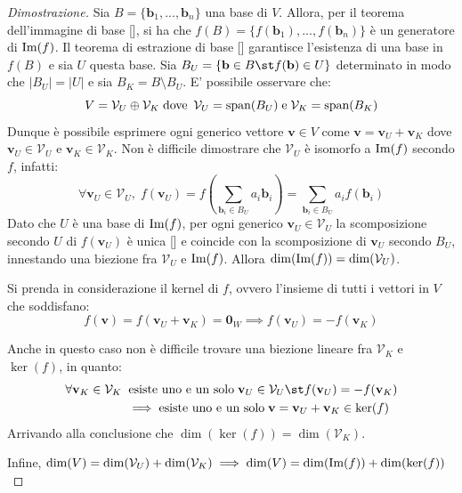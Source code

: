     \begin{proof}[Dimostrazione]
        Sia $B = \{ \mathbf{b}_{1}, ..., \mathbf{b}_{n} \}$ una base di $V$. Allora, per il teorema dell'immagine di base [], si ha che $f(B) = \{f(\mathbf{b}_{1}), ..., f(\mathbf{b}_{n})\}$ è un generatore di $\textnormal{Im}(f)$.
        Il teorema di estrazione di base [] garantisce l'esistenza di una base in $f(B)$ e sia $U$ questa base. Sia $B_U = \{\mathbf{b} \in B \st f(\mathbf{b}) \in U\}$ determinato in modo che $|B_U| = |U|$ e sia $B_K = B \setminus B_U$. E' possibile osservare che:
        \[
            V = \mathcal{V}_U \oplus \mathcal{V}_K \; \textnormal{dove} \;\: \mathcal{V}_U = \textnormal{span}(B_U) \; \textnormal{e} \; \mathcal{V}_K = \textnormal{span}(B_K)
        \]
        Dunque è possibile esprimere ogni generico vettore $\mathbf{v} \in V$ come $\mathbf{v} = \mathbf{v}_U + \mathbf{v}_K$ dove $\mathbf{v}_U \in \mathcal{V}_U$ e $\mathbf{v}_K \in \mathcal{V}_K$.
        Non è difficile dimostrare che $\mathcal{V}_U$ è isomorfo a $\textnormal{Im}(f)$ secondo $f$, infatti:
        \[
            \forall \mathbf{v}_U \in \mathcal{V}_U, \; f(\mathbf{v}_U) = f(\sum_{\mathbf{b}_{i} \in B_U} a_i \mathbf{b}_{i}) = \sum_{\mathbf{b}_{i} \in B_U} a_i f(\mathbf{b}_{i})
        \]
        Dato che $U$ è una base di $\textnormal{Im}(f)$, per ogni generico $\mathbf{v}_U \in \mathcal{V}_U$ la scomposizione secondo $U$ di $f(\mathbf{v}_U)$ è unica [] e coincide con la scomposizione di $\mathbf{v}_U$ secondo $B_U$, innestando una biezione fra $\mathcal{V}_U$ e $\textnormal{Im}(f)$.
        Allora $\dim(\textnormal{Im}(f)) = \dim(\mathcal{V}_U)$.

        \vspace{10pt}
        Si prenda in considerazione il kernel di $f$, ovvero l'insieme di tutti i vettori in $V$ che soddisfano:
        \[
            f(\mathbf{v}) = f(\mathbf{v}_U + \mathbf{v}_K) = \mathbf{0}_W \implies f(\mathbf{v}_U) = -f(\mathbf{v}_K)
        \]

        Anche in questo caso non è difficile trovare una biezione lineare fra $\mathcal{V}_K$ e $\ker(f)$, in quanto:
        \[
            \begin{aligned}
                \forall \mathbf{v}_K \in \mathcal{V}_K \;&\;
                \textnormal{esiste uno e un solo} \;
                \mathbf{v}_U \in \mathcal{V}_U \st
                f(\mathbf{v}_U) = -f(\mathbf{v}_K) \\
                &\implies \textnormal{esiste uno e un solo} \;
                \mathbf{v} = \mathbf{v}_U + \mathbf{v}_K \in \ker(f)
            \end{aligned}
        \]
        Arrivando alla conclusione che $\dim(\ker(f)) = \dim(\mathcal{V}_K)$.

        \vspace{10pt}
        Infine, $\dim(V) = \dim(\mathcal{V}_U) + \dim(\mathcal{V}_K) \implies \dim(V) = \dim(\textnormal{Im}(f)) + \dim(\ker(f))$
    \end{proof}




